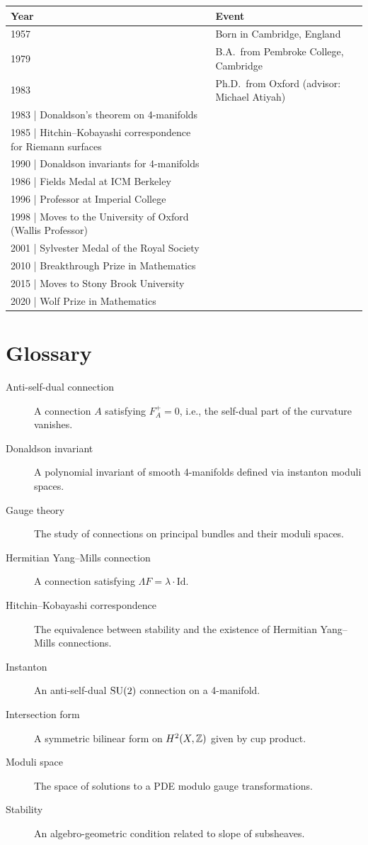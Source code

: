 \begin{tabularx}{\linewidth}{|p{1.5cm}|>{\raggedright\arraybackslash}X|}
\hline
\textbf{Year} & \textbf{Event} \\ \hline
1957 & Born in Cambridge, England \\ \hline
1979 & B.A.\ from Pembroke College, Cambridge \\ \hline
1983 & Ph.D.\ from Oxford (advisor: Michael Atiyah) \\ \hline
1983 | Donaldson's theorem on 4-manifolds \\ \hline
1985 | Hitchin--Kobayashi correspondence for Riemann surfaces \\ \hline
1990 | Donaldson invariants for 4-manifolds \\ \hline
1986 | Fields Medal at ICM Berkeley \\ \hline
1996 | Professor at Imperial College \\ \hline
1998 | Moves to the University of Oxford (Wallis Professor) \\ \hline
2001 | Sylvester Medal of the Royal Society \\ \hline
2010 | Breakthrough Prize in Mathematics \\ \hline
2015 | Moves to Stony Brook University \\ \hline
2020 | Wolf Prize in Mathematics \\ \hline
\end{tabularx}

\section*{Glossary}

\begin{description}
    \item[Anti-self-dual connection] A connection $A$ satisfying $F_A^+ = 0$, i.e., the self-dual part of the curvature vanishes.
    \item[Donaldson invariant] A polynomial invariant of smooth 4-manifolds defined via instanton moduli spaces.
    \item[Gauge theory] The study of connections on principal bundles and their moduli spaces.
    \item[Hermitian Yang--Mills connection] A connection satisfying $\Lambda F = \lambda \cdot \mathrm{Id}$.
    \item[Hitchin--Kobayashi correspondence] The equivalence between stability and the existence of Hermitian Yang--Mills connections.
    \item[Instanton] An anti-self-dual $\operatorname{SU}(2)$ connection on a 4-manifold.
    \item[Intersection form] A symmetric bilinear form on $H^2(X,\mathbb{Z})$ given by cup product.
    \item[Moduli space] The space of solutions to a PDE modulo gauge transformations.
    \item[Stability] An algebro-geometric condition related to slope of subsheaves.
\end{description}

